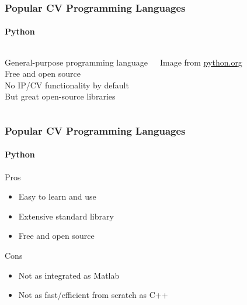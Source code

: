 \documentclass[xetex,professionalfont]{beamer}
\begin{document}
\begin{frame}
\frametitle{Popular CV Programming Languages}
\framesubtitle{Python}

\begin{columns}

General-purpose programming language \\\medskip
Free and open source\\\medskip %
No IP/CV functionality by default \\\medskip
But great open-source libraries


\begin{center}
{
	{\centering Image from \url{python.org}}}
\end{center}

\end{columns}

\end{frame}


\begin{frame}
\frametitle{Popular CV Programming Languages}
\framesubtitle{Python}

Pros
\begin{itemize}
	\item Easy to learn and use
	\item Extensive standard library
	\item Free and open source
\end{itemize}

\bigskip
Cons
\begin{itemize}
	\item Not as integrated as Matlab
	\item Not as fast/efficient from scratch as C++ %
\end{itemize}

\end{frame}

\end{document}
